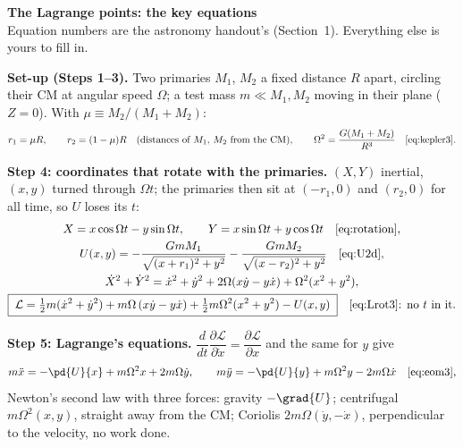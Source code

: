 \documentclass[10pt]{article}
\newcommand{\Om}{\Omega}
\newcommand{\Lag}{\mathcal{L}}
\begin{document}
\begin{center}
  {\large\bfseries The Lagrange points: the key equations}\\[1pt]
  {\small Equation numbers are the astronomy handout's (Section~1). Everything else is yours to fill in.}
\end{center}

\textbf{Set-up (Steps 1--3).} Two primaries $M_1$, $M_2$ a fixed distance $R$ apart, circling
their CM at angular speed $\Om$; a test mass $m \ll M_1, M_2$ moving in their plane ($Z = 0$).
With $\mu \equiv M_2/(M_1 + M_2)$:
\begin{equation*}
  r_1 = \mu R, \qquad r_2 = (1 - \mu)R \quad\text{(distances of $M_1$, $M_2$ from the CM)}, \qquad
  \Om^2 = \frac{G(M_1 + M_2)}{R^3} \quad\text{\eqref{eq:kepler3}} .
\end{equation*}

\textbf{Step 4: coordinates that rotate with the primaries.} $(X, Y)$ inertial, $(x, y)$ turned
through $\Om t$; the primaries then sit at $(-r_1, 0)$ and $(r_2, 0)$ for all time, so $U$ loses
its $t$:
\begin{gather*}
  X = x\cos\Om t - y\sin\Om t, \qquad Y = x\sin\Om t + y\cos\Om t \quad\text{\eqref{eq:rotation}}, \\
  U(x, y) = -\frac{GmM_1}{\sqrt{(x + r_1)^2 + y^2}} - \frac{GmM_2}{\sqrt{(x - r_2)^2 + y^2}} \quad\text{\eqref{eq:U2d}}, \\
  \dot X^2 + \dot Y^2 = \dot x^2 + \dot y^2 + 2\Om(x\dot y - y\dot x) + \Om^2(x^2 + y^2), \\
  \boxed{\;\Lag = \tfrac12 m(\dot x^2 + \dot y^2) + m\Om\,(x\dot y - y\dot x)
  + \tfrac12 m\Om^2(x^2 + y^2) - U(x, y)\;} \quad\text{\eqref{eq:Lrot3}: no $t$ in it.}
\end{gather*}

\textbf{Step 5: Lagrange's equations.} $\dfrac{d}{dt}\dfrac{\partial\Lag}{\partial\dot x} = \dfrac{\partial\Lag}{\partial x}$ and the same for $y$ give
\begin{equation*}
  m\ddot x = -\pd{U}{x} + m\Om^2 x + 2m\Om\dot y, \qquad
  m\ddot y = -\pd{U}{y} + m\Om^2 y - 2m\Om\dot x \quad\text{\eqref{eq:eom3}},
\end{equation*}
Newton's second law with three forces: gravity $-\grad{U}$; centrifugal $m\Om^2(x, y)$, straight
away from the CM; Coriolis $2m\Om(\dot y, -\dot x)$, perpendicular to the velocity, no work done.
\end{document}
